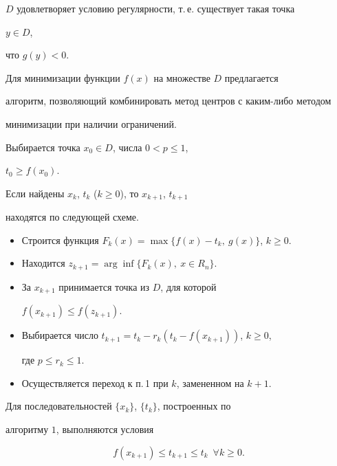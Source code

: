 $D$ удовлетворяет условию регулярности, т.\,е.{} существует такая точка 


$y\in D$, 


что $g(y)<0$. 


 


Для минимизации функции $f(x)$ на множестве $D$ предлагается 


алгоритм, позволяющий комбинировать метод центров с каким-либо методом 


минимизации при наличии ограничений. 


 


\begin{alg} Выбирается точка $x_0\in D$, числа $0<p\le 1$, 


$t_0\ge f(x_0)$. 


Если найдены $x_k$, $t_k$ ($k\ge 0$), то $x_{k+1}$, $t_{k+1}$ 


находятся по следующей схеме. 


\begin{itemize} 


\item[1.] Строится функция $F_k(x)=\max\{f(x)-t_k,\ g(x)\}$, $k\ge 0$. 


\item[2.] Находится $z_{k+1}=\arg\inf\{F_k(x),\ x\in R_n\}$. 


\item[3.] За $x_{k+1}$ принимается точка из $D$, для которой 


$f(x_{k+1})\le f(z_{k+1})$. 


\item[4.] Выбирается число $t_{k+1}=t_k-r_k(t_k-f(x_{k+1}))$, $k\ge 0$, 


где $p\le r_k\le 1$. 


\item[5.] Осуществляется переход к п.\,1 при $k$, замененном на $k+1$. 


\end{itemize} 


\end{alg} 


 


\begin{lem} Для последовательностей $\{x_k\}$, $\{t_k\}$, построенных по 


алгоритму $1$, выполняются условия 


\begin{equation} 


f(x_{k+1})\le t_{k+1}\le t_k\ \;\forall k\ge 0. 


\end{equation} 


\end{lem} 


